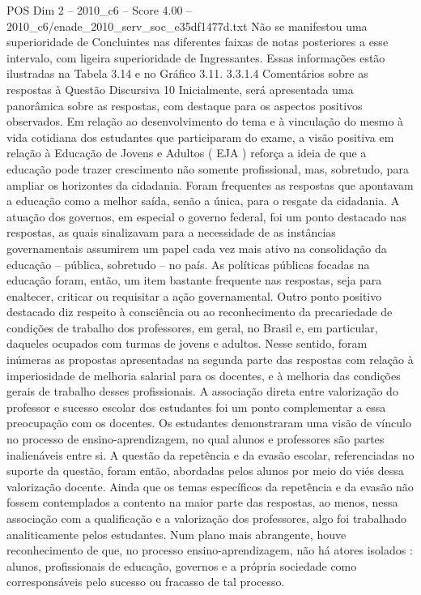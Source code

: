 \begin{textsample}{POS Dim 2 – 2010\_c6 – Score 4.00 – 2010\_c6/enade\_2010\_serv\_soc\_e35df1477d.txt}
Não se manifestou uma superioridade de Concluintes nas diferentes faixas de notas posteriores a esse intervalo, com ligeira superioridade de Ingressantes.
Essas informações estão ilustradas na Tabela 3.14 e no Gráfico 3.11. 3.3.1.4 Comentários sobre as respostas à Questão Discursiva 10 Inicialmente, será apresentada uma panorâmica sobre as respostas, com destaque para os aspectos positivos observados.
Em relação ao desenvolvimento do tema e à vinculação do mesmo à vida cotidiana dos estudantes que participaram do exame, a visão positiva em relação à Educação de Jovens e Adultos ( EJA ) reforça a ideia de que a educação pode trazer crescimento não somente profissional, mas, sobretudo, para ampliar os horizontes da cidadania.
Foram frequentes as respostas que apontavam a educação como a melhor saída, senão a única, para o resgate da cidadania.
A atuação dos governos, em especial o governo federal, foi um ponto destacado nas respostas, as quais sinalizavam para a necessidade de as instâncias governamentais assumirem um papel cada vez mais ativo na consolidação da educação – pública, sobretudo – no país.
As políticas públicas focadas na educação foram, então, um item bastante frequente nas respostas, seja para enaltecer, criticar ou requisitar a ação governamental.
Outro ponto positivo destacado diz respeito à consciência ou ao reconhecimento da precariedade de condições de trabalho dos professores, em geral, no Brasil e, em particular, daqueles ocupados com turmas de jovens e adultos.
Nesse sentido, foram inúmeras as propostas apresentadas na segunda parte das respostas com relação à imperiosidade de melhoria salarial para os docentes, e à melhoria das condições gerais de trabalho desses profissionais.
A associação direta entre valorização do professor e sucesso escolar dos estudantes foi um ponto complementar a essa preocupação com os docentes.
Os estudantes demonstraram uma visão de vínculo no processo de ensino-aprendizagem, no qual alunos e professores são partes inalienáveis entre si.
A questão da repetência e da evasão escolar, referenciadas no suporte da questão, foram então, abordadas pelos alunos por meio do viés dessa valorização docente.
Ainda que os temas específicos da repetência e da evasão não fossem contemplados a contento na maior parte das respostas, ao menos, nessa associação com a qualificação e a valorização dos professores, algo foi trabalhado analiticamente pelos estudantes.
Num plano mais abrangente, houve reconhecimento de que, no processo ensino-aprendizagem, não há atores isolados : alunos, profissionais de educação, governos e a própria sociedade como corresponsáveis pelo sucesso ou fracasso de tal processo.

\end{textsample}
